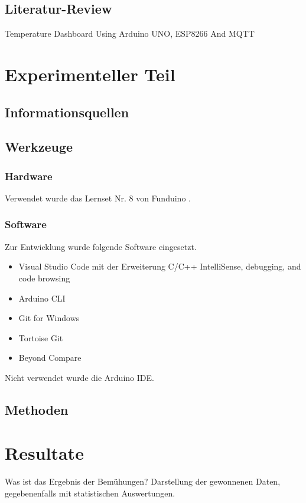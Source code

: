 \subsection{Literatur-Review}
Temperature Dashboard Using Arduino UNO, ESP8266 And MQTT \cite{ESP8266}
\cite{websocketcommunication}



\section{Experimenteller Teil}
\subsection{Informationsquellen}
\subsection{Werkzeuge}
\subsubsection{Hardware}
Verwendet wurde das Lernset Nr. 8 von Funduino \cite{lernset}.
\subsubsection{Software}
Zur Entwicklung wurde folgende Software eingesetzt.
\begin{itemize}
    \item Visual Studio Code \cite{vscode} mit der Erweiterung C/C++ IntelliSense, debugging, and code browsing \cite{intellisense}
    \item Arduino CLI \cite{arduinoCli}
    \item Git for Windows \cite{gitForWindows}
    \item Tortoise Git \cite{tortoiseGit} 
    \item Beyond Compare \cite{beyondCompare}
  \end{itemize}
Nicht verwendet wurde die Arduino IDE.
\subsection{Methoden}

\section{Resultate}
Was ist das Ergebnis der Bemühungen? Darstellung der gewonnenen Daten, gegebenenfalls mit 
statistischen Auswertungen.  

